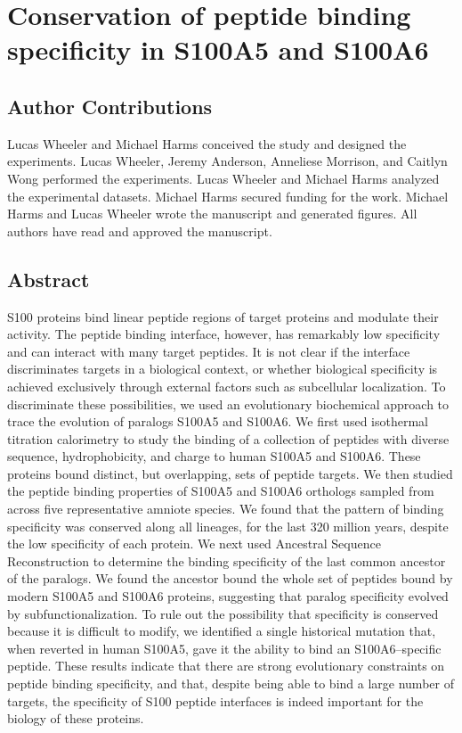 \chapter{Conservation of peptide binding specificity in S100A5 and S100A6}

\section{Author Contributions}
Lucas Wheeler and Michael Harms conceived the study and designed the experiments. Lucas Wheeler, Jeremy Anderson, Anneliese Morrison, and Caitlyn Wong performed the experiments. Lucas Wheeler and Michael Harms analyzed the experimental datasets. Michael Harms secured funding for the work. Michael Harms and Lucas Wheeler wrote the manuscript and generated figures. All authors have read and approved the manuscript. 

\section{Abstract}

S100 proteins bind linear peptide regions of target proteins and modulate
their activity. The peptide binding interface, however, has remarkably
low specificity and can interact with many target peptides. It is
not clear if the interface discriminates targets in a biological context,
or whether biological specificity is achieved exclusively through
external factors such as subcellular localization. To discriminate
these possibilities, we used an evolutionary biochemical approach
to trace the evolution of paralogs S100A5 and S100A6. We first used
isothermal titration calorimetry to study the binding of a collection
of peptides with diverse sequence, hydrophobicity, and charge to human
S100A5 and S100A6. These proteins bound distinct, but overlapping,
sets of peptide targets. We then studied the peptide binding properties
of S100A5 and S100A6 orthologs sampled from across five representative
amniote species. We found that the pattern of binding specificity
was conserved along all lineages, for the last 320 million years,
despite the low specificity of each protein. We next used Ancestral
Sequence Reconstruction to determine the binding specificity of the
last common ancestor of the paralogs. We found the ancestor bound
the whole set of peptides bound by modern S100A5 and S100A6 proteins,
suggesting that paralog specificity evolved by subfunctionalization.
To rule out the possibility that specificity is conserved because
it is difficult to modify, we identified a single historical mutation
that, when reverted in human S100A5, gave it the ability to bind an
S100A6--specific peptide. These results indicate that there are strong
evolutionary constraints on peptide binding specificity, and that,
despite being able to bind a large number of targets, the specificity
of S100 peptide interfaces is indeed important for the biology of
these proteins. 

